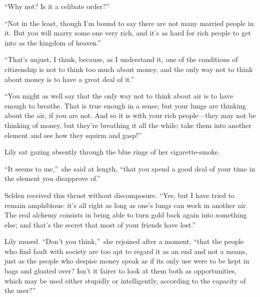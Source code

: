 \documentclass[12pt,a4paper]{book}
\begin{document}
``Why not? Is it a celibate order?''





``Not in the least, though I'm bound to say there are not many
married people in it. But you will marry some one very rich, and
it's as hard for rich people to get into as the kingdom of
heaven.''





``That's unjust, I think, because, as I understand it, one of the
conditions of citizenship is not to think too much about money,
and the only way not to think about money is to have a great deal
of it.''





``You might as well say that the only way not to think about air
is to have enough to breathe. That is true enough in a sense; but
your lungs are thinking about the air, if you are not. And so it
is with your rich people---they may not be thinking of money, but
they're breathing it all the while; take them into another
element and see how they squirm and gasp!''





Lily sat gazing absently through the blue rings of her
cigarette-smoke.





``It seems to me,''\ she said at length, ``that you spend a good deal
of your time in the element you disapprove of.''





Selden received this thrust without discomposure. ``Yes; but I
have tried to remain amphibious: it's all right as long as one's
lungs can work in another air. The real alchemy consists in being
able to turn gold back again into something else; and that's the
secret that most of your friends have lost.''





Lily mused. ``Don't you think,''\ she rejoined after a moment, ``that
the people who find fault with society are too apt to regard it
as an end and not a means, just as the people who despise
money speak as if its only use were to be kept in bags and
gloated over? Isn't it fairer to look at them both as
opportunities, which may be used either stupidly or
intelligently, according to the capacity of the user?''
\end{document}
